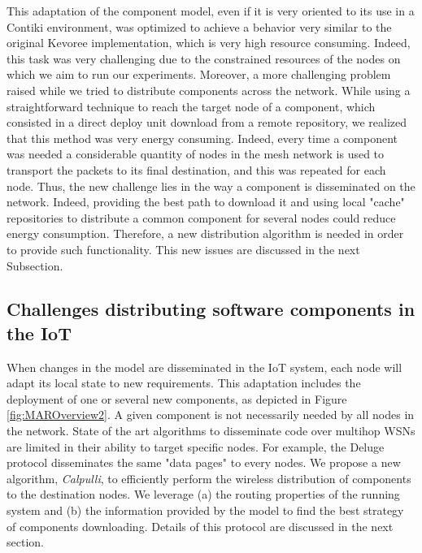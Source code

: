 This adaptation of the component model, even if it is very oriented to its use in a Contiki environment, was optimized to achieve a behavior very similar to the original Kevoree implementation, which is very high resource consuming.
Indeed, this task was very challenging due to the constrained resources of the nodes on which we aim to run our experiments.
Moreover, a more challenging problem raised while we tried to distribute components across the network.
While using a straightforward technique to reach the target node of a component, which consisted in a direct deploy unit download from a remote repository, we realized that this method was very energy consuming.
Indeed, every time a component was needed a considerable quantity of nodes in the mesh network is used to transport the packets to its final destination, and this was repeated for each node.
Thus, the new challenge lies in the way a component is disseminated on the network.
Indeed, providing the best path to download it and using local "cache" repositories to distribute a common component for several nodes could reduce energy consumption.
Therefore, a new distribution algorithm is needed in order to provide such functionality.
This new issues are discussed in the next Subsection.

\subsection{Challenges distributing software components in the IoT}
When changes in the model are disseminated in the IoT system, each node will adapt its local state to new requirements. This adaptation includes the deployment of one or several new components, as depicted in Figure \ref{fig:MAROverview2}. A given component is not necessarily needed by all nodes in the network. State of the art algorithms to disseminate code over multihop WSNs are limited in their ability to target specific nodes. For example, the Deluge protocol\cite{hui2004dynamic} disseminates the same "data pages" to every nodes. We propose a new algorithm, \emph{Calpulli}, to efficiently perform the wireless distribution of components to the destination nodes. We leverage (a) the routing properties of the running system and (b) the information provided by the model to find the best strategy of components downloading.
Details of this protocol are discussed in the next section.

